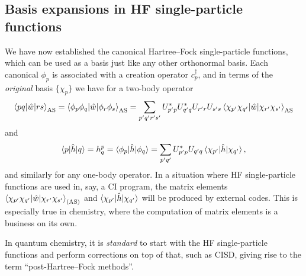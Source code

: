 \documentclass{report}
\theoremstyle{plain}
\theoremstyle{definition}
\begin{document}
\subsection{Basis expansions in HF single-particle functions}

We have now established the canonical Hartree--Fock single-particle functions, which can
be used as a basis just like any other orthonormal basis. Each
canonical $\phi_p$ is associated with a creation operator
$c_p^\dag$, and in terms of the \emph{original} basis $\{\chi_p\}$ we
have for a two-body operator
\begin{equation}
  \braket{pq|\hat{w}|rs}_\text{AS} = \braket{\phi_p \phi_q|\hat{w}|\phi_r \phi_s}_\text{AS} = \sum_{p'q'r's'} U^*_{p'p} U^*_{q'q} U_{r'r}
  U_{s's}
  \braket{\chi_{p'}\chi_{q'}|\hat{w}|\chi_{r'}\chi_{s'}}_\text{AS} \label{eq:antisymm-elems-hf-inter}
\end{equation}
and
\begin{equation}
 \braket{p|\hat{h}|q} = h^p_q = \braket{\phi_p|\hat{h}|\phi_q} = \sum_{p'q'} U_{p'p}^*
  U_{q'q} \braket{\chi_{p'}|\hat{h}|\chi_{q'}},
\end{equation}
and similarly for any one-body operator. In a situation where HF
single-particle functions are used in, say, a CI program, the matrix
elements
$\braket{\chi_{p'}\chi_{q'}|\hat{w}|\chi_{r'}\chi_{s'}}_{\text{(AS)}}$
and $\braket{\chi_{p'}|\hat{h}|\chi_{q'}}$ will be produced by
external codes. This is especially true in chemistry, where the
computation of matrix elements is a business on its own.

In quantum chemistry, it is \emph{standard} to start with the HF
single-particle functions and perform corrections on top of that, such
as CISD, giving rise to the term ``post-Hartree--Fock methods''.
\end{document}
